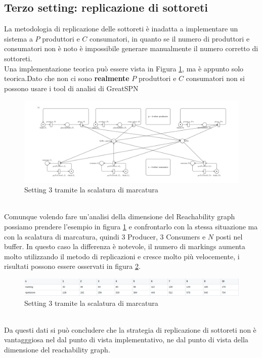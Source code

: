 \documentclass{article}
\newcommand{\greatspn}{GreatSPN}
\begin{document}
\subsection{Terzo  setting: replicazione di sottoreti}\label{SEC:terzo-replica}
La metodologia di replicazione delle sottoreti è inadatta a implementare un sistema a $P$ produttori e $C$ consumatori, in quanto se il numero di produttori e consumatori non è noto è impossibile generare manualmente il numero corretto di sottoreti.\\
Una implementazione teorica può essere vista in Figura \ref{FIG:setting3_markdown}, ma è appunto solo teorica.Dato che non ci sono \textbf{realmente} $P$ produttori e $C$ consumatori non si possono usare i tool di analisi di \greatspn 
\begin{figure}[!h]
\centering
\centerline{\includegraphics[scale=0.2]{./Esercizio2_img/setting3_scale.png}}
\caption{Setting 3 tramite la scalatura di marcatura} \label{FIG:setting3_markdown}
\end{figure}\\
Comunque volendo fare un'analisi della dimensione del Reachability graph possiamo prendere l'esempio in figura \ref{FIG:setting3_markdown} e confrontarlo con la stessa situazione ma con la scalatura di marcatura, quindi 3 Producer, 3 Consumers e $N$ posti nel buffer.
In questo caso la differenza è notevole, il numero di markings aumenta molto utilizzando il metodo di replicazioni e cresce molto più velocemente, i risultati possono essere osservati in figura \ref{FIG:confronto}.\\
\begin{figure}[!h]
\centering
\centerline{\includegraphics[scale=0.5]{./Esercizio2_img/confronto.png}}
\caption{Setting 3 tramite la scalatura di marcatura} \label{FIG:confronto}
\end{figure}\\Da questi dati si può concludere che la strategia di replicazione di sottoreti non è vantagggiosa nel dal punto di vista implementativo, ne dal punto di vista della dimensione del reachability graph.
\end{document}
